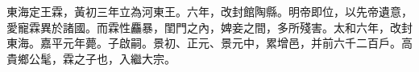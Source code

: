 
\begin{pinyinscope}
東海定王霖，黃初三年立為河東王。六年，改封館陶縣。明帝即位，以先帝遺意，愛寵霖異於諸國。而霖性麤暴，閨門之內，婢妾之間，多所殘害。太和六年，改封東海。嘉平元年薨。子啟嗣。景初、正元、景元中，累增邑，并前六千二百戶。高貴鄉公髦，霖之子也，入繼大宗。


\end{pinyinscope}